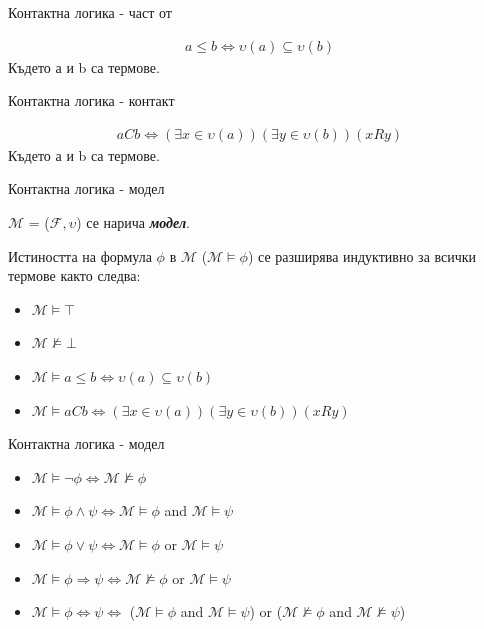 \documentclass[14pt, aspectratio=169]{beamer}
\newcommand\M{\mathcal{M}}
\newcommand\F{\mathcal{F}}
\begin{document}
\begin{frame}{Контактна логика - част от}
	\begin{definition}[Част от]
		\begin{gather*}
			a \leq b \iff \upsilon(a) \subseteq \upsilon(b)
		\end{gather*}
		Където а и b са термове.
	\end{definition}
\end{frame}

\begin{frame}{Контактна логика - контакт}
	\begin{definition}[Контакт]
		\begin{gather*}
			aCb \iff (\exists x \in \upsilon(a))(\exists y \in \upsilon(b))(xRy)
		\end{gather*}
		Където а и b са термове.
	\end{definition}
\end{frame}

\begin{frame}{Контактна логика - модел}
	\begin{definition}[Модел]
		$\M$ = ($\F, \upsilon$) се нарича \textbf{\textit{модел}}.

		Истиността на формула $\phi$ в $\M$ ($\M \models \phi$) се разширява индуктивно за всички термове както следва:
		\begin{itemize}
			\item $\M \models \top$
			\item $\M \not\models \bot$
			\item $\M \models a \leq b \iff \upsilon(a) \subseteq \upsilon(b)$
			\item $\M \models aCb \iff (\exists x \in \upsilon(a))(\exists y \in \upsilon(b))(xRy)$
		\end{itemize}
	\end{definition}
\end{frame}

\begin{frame}{Контактна логика - модел}
	\begin{definition}[Модел]
		\begin{itemize}
			\item $\M \models \neg \phi \iff \M \not\models \phi$
			\item $\M \models \phi \land \psi \iff \M \models \phi$ and $\M \models \psi$
			\item $\M \models \phi \lor \psi \iff \M \models \phi$ or $\M \models \psi$
			\item $\M \models \phi \Rightarrow \psi \iff \M \not\models \phi$ or $\M \models \psi$
			\item $\M \models \phi \Leftrightarrow \psi \iff$ ($\M \models \phi$ and $\M \models \psi$) or ($\M \not\models \phi$ and $\M \not\models \psi$)
		\end{itemize}
	\end{definition}
\end{frame}
\end{document}
